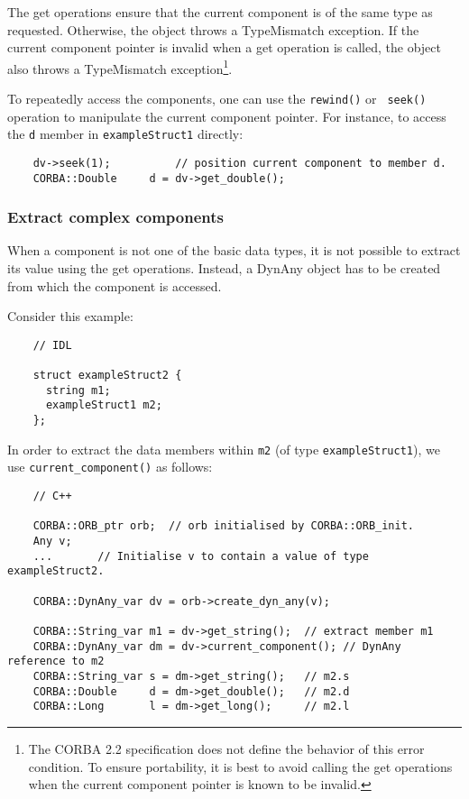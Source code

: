 \documentclass[11pt,twoside,onecolumn]{book}
\begin{document}
The get operations ensure that the current component is of the same type as
requested. Otherwise, the object throws a TypeMismatch exception. If the
current component pointer is invalid when a get operation is called, the
object also throws a TypeMismatch exception\footnote{The CORBA 2.2
specification does not define the behavior of this error condition. To
ensure portability, it is best to avoid calling the get operations when the
current component pointer is known to be invalid.}. 

To repeatedly access the components, one can use the {\tt rewind()} or {\tt
seek()} operation to manipulate the current component pointer. For
instance, to access the {\tt d} member in {\tt exampleStruct1} directly:

{\small
\begin{verbatim}
    dv->seek(1);          // position current component to member d.
    CORBA::Double     d = dv->get_double();
\end{verbatim}
}

\subsubsection{Extract complex components}

When a component is not one of the basic data types, it is not possible to
extract its value using the get operations. Instead, a DynAny object has to
be created from which the component is accessed. 

Consider this example:

{\small
\begin{verbatim}
    // IDL
    
    struct exampleStruct2 {
      string m1;
      exampleStruct1 m2;
    };
\end{verbatim}
}

In order to extract the data members within {\tt m2} (of type 
{\tt exampleStruct1}), we use {\tt current\_component()} as follows:

{\small
\begin{verbatim}
    // C++
    
    CORBA::ORB_ptr orb;  // orb initialised by CORBA::ORB_init.
    Any v;
    ...       // Initialise v to contain a value of type exampleStruct2.
    
    CORBA::DynAny_var dv = orb->create_dyn_any(v);
    
    CORBA::String_var m1 = dv->get_string();  // extract member m1
    CORBA::DynAny_var dm = dv->current_component(); // DynAny reference to m2
    CORBA::String_var s = dm->get_string();   // m2.s
    CORBA::Double     d = dm->get_double();   // m2.d
    CORBA::Long       l = dm->get_long();     // m2.l
\end{verbatim}
}
\end{document}
